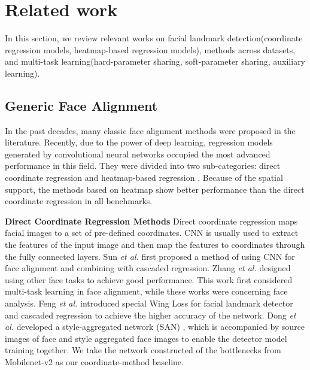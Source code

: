 \documentclass[journal,transmag]{IEEEtran}
\begin{document}
\section{Related work}
\label{sec:realted_work}
In this section, we review relevant works on facial landmark detection(coordinate regression models, heatmap-based regression models), methods across datasets, and multi-task learning(hard-parameter sharing, soft-parameter sharing, auxiliary learning).


\subsection{Generic Face Alignment}
In the past decades, many classic face alignment methods \cite{Timothy1995Active,cootes2001active,cristinacce2008automatic,xiong2013supervised} were proposed in the literature.
Recently, due to the power of deep learning, regression models generated by convolutional neural networks occupied the most advanced performance in this field.
They were divided into two sub-categories: direct coordinate regression \cite{sun2013deep,zhang2014facial,feng2018wing,dong2018style} and heatmap-based regression \cite{kowalski2017deep,LABWFLW,HRNET}.
Because of the spatial support\cite{zhang2020distribution}, the methods based on heatmap show better performance than the direct coordinate regression in all benchmarks.


{\bf Direct Coordinate Regression Methods} 
Direct coordinate regression maps facial images to a set of pre-defined coordinates. 
CNN is usually used to extract the features of the input image and then map the features to coordinates through the fully connected layers.
Sun \emph{et al.} \cite{sun2013deep} first proposed a method of using CNN for face alignment and combining with cascaded regression.
Zhang \emph{et al.} \cite{zhang2014facial} designed using other face tasks to achieve good performance. This work first considered multi-task learning in face alignment, while these works were concerning face analysis.
Feng \emph{et al.} \cite{feng2018wing} introduced special Wing Loss for facial landmark detector and cascaded regression to achieve the higher accuracy of the network.
Dong \emph{et al.} developed a style-aggregated network (SAN) \cite{dong2018style}, which is accompanied by source images of face and style aggregated face images to enable the detector model training together.
We take the network constructed of the bottlenecks from Mobilenet-v2\cite{sandler2018mobilenetv2} as our coordinate-method baseline.
\end{document}
